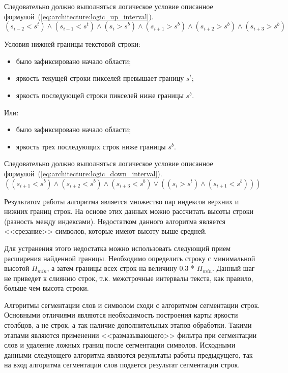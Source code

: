 Следовательно должно выполняться логическое условие описанное формулой~(\ref{eq:architecture:logic_up_interval}).
\begin{equation}
  \label{eq:architecture:logic_up_interval}
  (s_{i-2} < s^{t}) \wedge (s_{i-1} < s^{t}) \wedge (s_i > s^{b}) \wedge (s_{i+1} > s^{b}) \wedge (s_{i+2} > s^{b}) \wedge (s_{i+3} > s^{b})
\end{equation}

Условия нижней границы текстовой строки:
\begin{itemize}     
  \item было зафиксировано начало области;
  \item яркость текущей строки пикселей превышает границу $ s^{t} $;
  \item яркость последующей строки пикселей ниже границы $ s^{b} $.
\end{itemize}
     
Или:

\begin{itemize}
   \item было зафиксировано начало области;
   \item яркость трех последующих строк ниже границы $ s^{b} $.
\end{itemize}

Следовательно должно выполняться логическое условие описанное формулой~(\ref{eq:architecture:logic_down_interval}).
\begin{equation}
  \label{eq:architecture:logic_down_interval}
  ((s_{i+1} < s^{b}) \wedge (s_{i+2} < s^{b}) \wedge (s_{i+3} < s^{b}) \vee ((s_i > s^{t}) \wedge (s_{i+1} < s^{b})))
\end{equation}

Результатом работы алгоритма является множество пар индексов верхних и нижних границ строк. На основе этих данных можно рассчитать высоты строки (разность между индексами). Недостатком данного алгоритма является <<срезание>> символов, которые имеют высоту выше средней.

Для устранения этого недостатка можно использовать следующий прием расширения найденной границы. Необходимо определить строку с минимальной высотой $ H_{min} $, а затем границы всех строк на величину 0.3 * $ H_{min} $. Данный шаг не приведет к слиянию строк, т.к. межстрочные интервалы текста, как правило, больше чем высота строки.
 
Алгоритмы сегментации слов и символом сходи с алгоритмом сегментации строк. Основными отличиями являются необходимость построения карты яркости столбцов, а не строк, а так наличие дополнительных этапов обработки. Такими этапами являются применении <<размазывающего>> фильтра при сегментации слов и удаление ложных границ после сегментации символов. Исходными данными следующего алгоритма являются результаты работы предыдущего, так на вход алгоритма сегментации слов подается результат сегментации строк.


